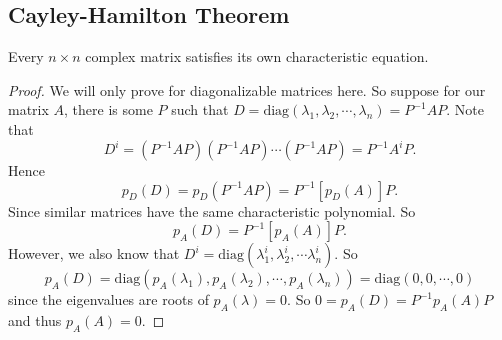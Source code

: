 \documentclass[a4paper]{article}
\begin{document}
\subsection{Cayley-Hamilton Theorem}
\begin{thm}
  Every $n\times n$ complex matrix satisfies its own characteristic equation.
\end{thm}

\begin{proof}
  We will only prove for diagonalizable matrices here. So suppose for our matrix $A$, there is some $P$ such that $D = \mathrm{diag}(\lambda_1, \lambda_2, \cdots, \lambda_n) = P^{-1}AP$.
  Note that
  \[
    D^i = (P^{-1}AP)(P^{-1}AP)\cdots(P^{-1}AP) = P^{-1}A^iP.
  \]
  Hence
  \[
    p_D(D) = p_D(P^{-1}AP) = P^{-1}[p_D(A)]P.
  \]
  Since similar matrices have the same characteristic polynomial. So
  \[
    p_A(D) = P^{-1}[p_A(A)]P.
  \]
  However, we also know that $D^i = \mathrm{diag}(\lambda_1^i, \lambda_2^i, \cdots \lambda_n^i)$. So
  \[
    p_A(D) = \mathrm{diag}(p_A(\lambda_1), p_A(\lambda_2), \cdots, p_A(\lambda_n)) = \mathrm{diag}(0, 0, \cdots, 0)
  \]
  since the eigenvalues are roots of $p_A(\lambda) = 0$. So $0 = p_A(D) = P^{-1}p_A(A)P$ and thus $p_A(A) = 0$.
\end{proof}
\end{document}

